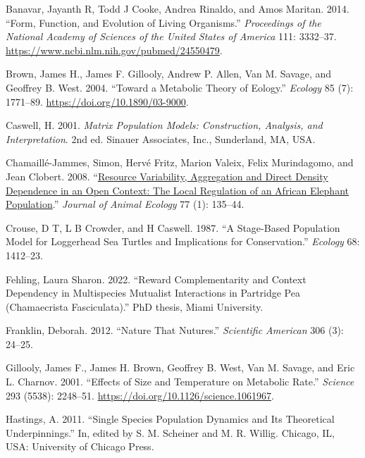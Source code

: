 \documentclass[
  letterpaper,
  DIV=11,
  numbers=noendperiod]{scrreprt}
\newlength{\cslhangindent}
\newenvironment{CSLReferences}[2] %
 {\begin{list}{}{%
  \setlength{\itemindent}{0pt}
  \setlength{\leftmargin}{0pt}
  \setlength{\parsep}{0pt}
  \ifodd #1
   \setlength{\leftmargin}{\cslhangindent}
   \setlength{\itemindent}{-1\cslhangindent}
  \fi
  \setlength{\itemsep}{#2\baselineskip}}}
 {\end{list}}
\begin{document}
\label{refs}
\begin{CSLReferences}{1}{0}
Banavar, Jayanth R, Todd J Cooke, Andrea Rinaldo, and Amos Maritan.
2014. {``Form, {Function}, and {Evolution} of {Living Organisms}.''}
\emph{Proceedings of the National Academy of Sciences of the United
States of America} 111: 3332--37.
\url{https://www.ncbi.nlm.nih.gov/pubmed/24550479}.

Brown, James H., James F. Gillooly, Andrew P. Allen, Van M. Savage, and
Geoffrey B. West. 2004. {``Toward a {Metabolic Theory} of {Eology}.''}
\emph{Ecology} 85 (7): 1771--89. \url{https://doi.org/10.1890/03-9000}.

Caswell, H. 2001. \emph{Matrix Population Models: {Construction},
Analysis, and Interpretation}. 2nd ed. {Sinauer Associates, Inc.,
Sunderland, MA, USA}.

Chamaillé-Jammes, Simon, Hervé Fritz, Marion Valeix, Felix Murindagomo,
and Jean Clobert. 2008.
{``\href{https://www.ncbi.nlm.nih.gov/pubmed/17986249}{Resource
Variability, Aggregation and Direct Density Dependence in an Open
Context: {The} Local Regulation of an {African} Elephant Population}.''}
\emph{Journal of Animal Ecology} 77 (1): 135--44.

Crouse, D T, L B Crowder, and H Caswell. 1987. {``A Stage-Based
Population Model for Loggerhead Sea Turtles and Implications for
Conservation.''} \emph{Ecology} 68: 1412--23.

Fehling, Laura Sharon. 2022. {``Reward {Complementarity} and {Context
Dependency} in {Multispecies Mutualist Interactions} in {Partridge Pea}
({Chamaecrista} Fasciculata).''} PhD thesis, Miami University.

Franklin, Deborah. 2012. {``Nature That Nutures.''} \emph{Scientific
American} 306 (3): 24--25.

Gillooly, James F., James H. Brown, Geoffrey B. West, Van M. Savage, and
Eric L. Charnov. 2001. {``Effects of {Size} and {Temperature} on
{Metabolic Rate}.''} \emph{Science} 293 (5538): 2248--51.
\url{https://doi.org/10.1126/science.1061967}.

Hastings, A. 2011. {``Single Species Population Dynamics and Its
Theoretical Underpinnings.''} In, edited by S. M. Scheiner and M. R.
Willig. {Chicago, IL, USA}: {University of Chicago Press}.


\end{CSLReferences}
\end{document}
